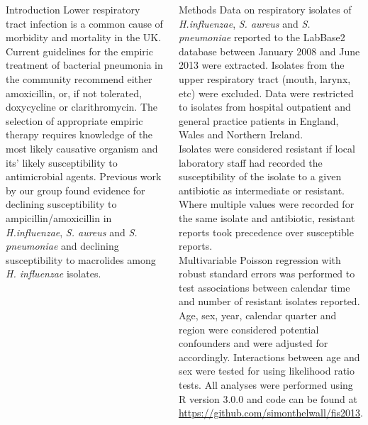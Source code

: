 \documentclass[final]{beamer}
\begin{document}
\begin{frame}
\begin{columns}[t]
  \begin{block}{Introduction}
  Lower respiratory tract infection is a common cause of morbidity and mortality in the UK. \cite{Davies2012}
   Current guidelines for the empiric treatment of bacterial pneumonia in the community recommend either amoxicillin, or, if not tolerated, doxycycline or clarithromycin. \cite{Lim2009}
   The selection of appropriate empiric therapy requires knowledge of the most likely causative organism and its' likely susceptibility to antimicrobial agents.
   Previous work by our group found evidence for declining susceptibility to ampicillin/amoxicillin in \textit{H.influenzae}, \textit{S. aureus} and \textit{S. pneumoniae} and declining susceptibility to macrolides among \textit{H. influenzae} isolates. \cite{Blackburn2011}
   \end{block}
  
  \begin{block}{Methods}
   Data on respiratory isolates of \textit{H.influenzae}, \textit{S. aureus} and \textit{S. pneumoniae} reported to the LabBase2 database between January 2008 and June 2013 were extracted. 
   Isolates from the upper respiratory tract (mouth, larynx, etc) were excluded.
   Data were restricted to isolates from hospital outpatient and general practice patients in England, Wales and Northern Ireland.\\
   Isolates were considered resistant if local laboratory staff had recorded the susceptibility of the isolate to a given antibiotic as intermediate or resistant. 
   Where multiple values were recorded for the same isolate and antibiotic, resistant reports took precedence over susceptible reports. \\
   Multivariable Poisson regression with robust standard errors was performed to test associations between calendar time and number of resistant isolates reported.
   Age, sex, year, calendar quarter and region were considered potential confounders and were adjusted for accordingly.
   Interactions between age and sex were tested for using likelihood ratio tests. 
   All analyses were performed using R version 3.0.0 and code can be found at \url{https://github.com/simonthelwall/fis2013}.
  \end{block}
  

\end{columns}
\end{frame}
\end{document}

